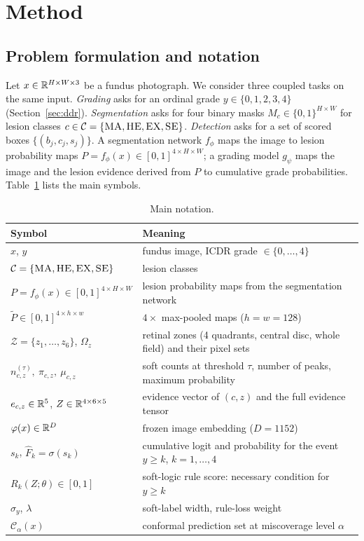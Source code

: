 \section{Method}
\label{sec:method}

\subsection{Problem formulation and notation}
Let $x\in\mathbb{R}^{H\times W\times 3}$ be a fundus photograph. We consider three coupled tasks on the same input. \emph{Grading} asks for an ordinal grade $y\in\{0,1,2,3,4\}$ (Section~\ref{sec:ddr}). \emph{Segmentation} asks for four binary masks $M_c\in\{0,1\}^{H\times W}$ for lesion classes $c\in\mathcal C=\{\textsc{MA},\textsc{HE},\textsc{EX},\textsc{SE}\}$. \emph{Detection} asks for a set of scored boxes $\{(b_j,c_j,s_j)\}$. A segmentation network $f_\phi$ maps the image to lesion probability maps $P=f_\phi(x)\in[0,1]^{4\times H\times W}$; a grading model $g_\psi$ maps the image and the lesion evidence derived from $P$ to cumulative grade probabilities. Table~\ref{tab:notation} lists the main symbols.

\begin{table}[!htbp]
\centering
\caption{Main notation.}
\label{tab:notation}
\small
\begin{tabular}{@{}lp{}@{}}
\toprule
Symbol & Meaning \\
\midrule
$x$, $y$ & fundus image, ICDR grade $\in\{0,\dots,4\}$ \\
$\mathcal C=\{\textsc{MA},\textsc{HE},\textsc{EX},\textsc{SE}\}$ & lesion classes \\
$P=f_\phi(x)\in[0,1]^{4\times H\times W}$ & lesion probability maps from the segmentation network \\
$\tilde P\in[0,1]^{4\times h\times w}$ & $4\times$ max-pooled maps ($h=w=128$) \\
$\mathcal Z=\{z_1,\dots,z_6\}$, $\Omega_z$ & retinal zones (4 quadrants, central disc, whole field) and their pixel sets \\
$n_{c,z}^{(\tau)},\ \pi_{c,z},\ \mu_{c,z}$ & soft counts at threshold $\tau$, number of peaks, maximum probability \\
$e_{c,z}\in\mathbb{R}^5$, $Z\in\mathbb{R}^{4\times6\times5}$ & evidence vector of $(c,z)$ and the full evidence tensor \\
$\varphi(x)\in\mathbb{R}^{D}$ & frozen image embedding ($D=1152$) \\
$s_k$, $\hat F_k=\sigma(s_k)$ & cumulative logit and probability for the event $y\ge k$, $k=1,\dots,4$ \\
$R_k(Z;\theta)\in[0,1]$ & soft-logic rule score: necessary condition for $y\ge k$ \\
$\sigma_y$, $\lambda$ & soft-label width, rule-loss weight \\
$\mathcal C_\alpha(x)$ & conformal prediction set at miscoverage level $\alpha$ \\
\bottomrule
\end{tabular}
\end{table}


